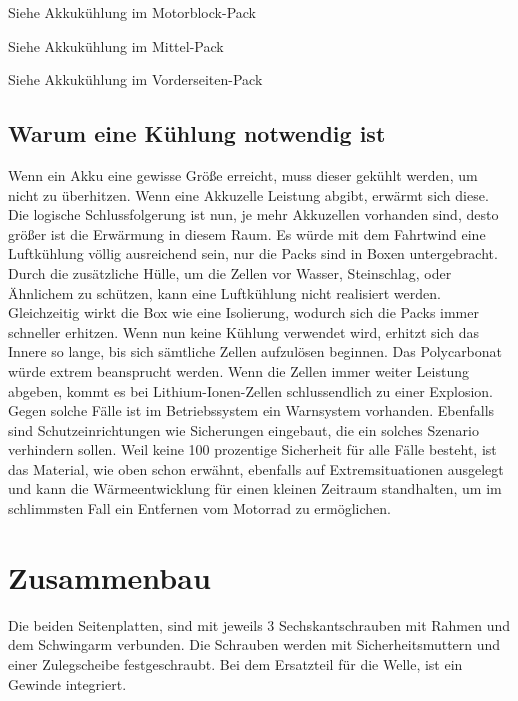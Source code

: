 Siehe Akkukühlung im Motorblock-Pack

Siehe Akkukühlung im Mittel-Pack

Siehe Akkukühlung im Vorderseiten-Pack

\subsection{Warum eine Kühlung notwendig ist}

Wenn ein Akku eine gewisse Größe erreicht, muss dieser gekühlt werden, um nicht zu überhitzen. Wenn eine Akkuzelle Leistung abgibt, erwärmt sich diese. Die logische Schlussfolgerung ist nun, je mehr Akkuzellen vorhanden sind, desto größer ist die Erwärmung in diesem Raum. Es würde mit dem Fahrtwind eine Luftkühlung völlig ausreichend sein, nur die Packs sind in Boxen untergebracht. Durch die zusätzliche Hülle, um die Zellen vor Wasser, Steinschlag, oder Ähnlichem zu schützen, kann eine Luftkühlung nicht realisiert werden. Gleichzeitig wirkt die Box wie eine Isolierung, wodurch sich die Packs immer schneller erhitzen.
Wenn nun keine Kühlung verwendet wird, erhitzt sich das Innere so lange, bis sich sämtliche Zellen aufzulösen beginnen. Das Polycarbonat würde extrem beansprucht werden. Wenn die Zellen immer weiter Leistung abgeben, kommt es bei Lithium-Ionen-Zellen schlussendlich zu einer Explosion.  
Gegen solche Fälle ist im Betriebssystem ein Warnsystem vorhanden. Ebenfalls sind Schutzeinrichtungen wie Sicherungen eingebaut, die ein solches Szenario verhindern sollen. 
Weil keine 100 prozentige Sicherheit für alle Fälle besteht, ist das Material, wie oben schon erwähnt, ebenfalls auf Extremsituationen ausgelegt und kann die Wärmeentwicklung für einen kleinen Zeitraum standhalten, um im schlimmsten Fall ein Entfernen vom Motorrad zu ermöglichen.

\newpage

\section{Zusammenbau}

Die beiden Seitenplatten, sind mit jeweils 3 Sechskantschrauben mit Rahmen und dem Schwingarm verbunden. Die Schrauben werden mit Sicherheitsmuttern und einer Zulegscheibe festgeschraubt. Bei dem Ersatzteil für die Welle, ist ein Gewinde integriert.




